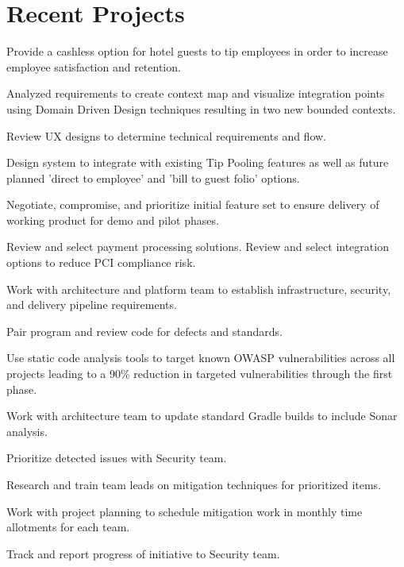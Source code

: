 \documentclass[]{deedy-resume}
\begin{document}
\begin{minipage}[t]{0.66\textwidth}
\section{Recent Projects}
Provide a cashless option for hotel guests to tip employees in order to increase employee satisfaction and retention.  
\begin{tightemize}
\item Analyzed requirements to create context map and visualize integration points using Domain Driven Design techniques resulting in two new bounded contexts.
\item Review UX designs to determine technical requirements and flow.
\item Design system to integrate with existing Tip Pooling features as well as future planned 'direct to employee' and 'bill to guest folio' options.
\item Negotiate, compromise, and prioritize initial feature set to ensure delivery of working product for demo and pilot phases.
\item Review and select payment processing solutions.  Review and select integration options to reduce PCI compliance risk.
\item Work with architecture and platform team to establish infrastructure, security, and delivery pipeline requirements.
\item Pair program and review code for defects and standards.
\end{tightemize}
\sectionsep

Use static code analysis tools to target known OWASP vulnerabilities across all projects leading to a 90\% reduction in targeted vulnerabilities through the first phase.
\begin{tightemize}
\item Work with architecture team to update standard Gradle builds to include Sonar analysis.
\item Prioritize detected issues with Security team.
\item Research and train team leads on mitigation techniques for prioritized items.
\item Work with project planning to schedule mitigation work in monthly time allotments for each team.
\item Track and report progress of initiative to Security team.
\end{tightemize}
\sectionsep

\end{minipage}
\end{document}
